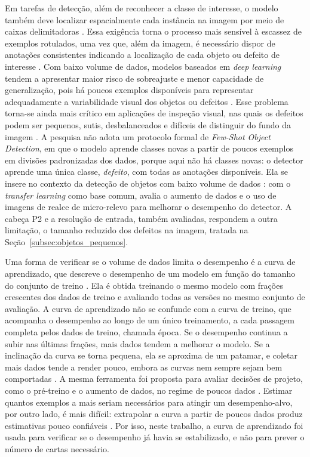 \documentclass[
    12pt,                %
    openright,           %
    oneside,             %
    a4paper,             %
    english,             %
    brazil               %
]{abntex2}
\begin{document}
Em tarefas de detecção, além de reconhecer a classe de interesse,
o modelo também deve localizar espacialmente cada instância na imagem
por meio de caixas delimitadoras \cite{Ramos2025}. Essa exigência torna
o processo mais sensível à escassez de exemplos rotulados, uma vez que,
além da imagem, é necessário dispor de anotações consistentes indicando
a localização de cada objeto ou defeito de interesse \cite{Situ2023}.
Com baixo volume de dados, modelos baseados em \textit{deep learning}
tendem a apresentar maior risco de sobreajuste e menor
capacidade de generalização, pois há poucos exemplos disponíveis para
representar adequadamente a variabilidade visual dos objetos ou
defeitos \cite{Wang2022}. Esse problema torna-se ainda mais crítico em
aplicações de inspeção visual, nas quais os defeitos podem ser pequenos,
sutis, desbalanceados e difíceis de distinguir do fundo da imagem
\cite{Chen2021, Wang2022}. A pesquisa não adota um protocolo formal de
\textit{Few-Shot Object Detection}, em que o modelo aprende classes
novas a partir de poucos exemplos em divisões padronizadas dos dados,
porque aqui não há classes novas: o detector aprende uma única classe,
\textit{defeito}, com todas as anotações disponíveis. Ela se insere no
contexto da detecção de objetos com
baixo volume de dados \cite{Situ2023}: com o \textit{transfer learning}
como base comum, avalia o aumento de dados e o uso de imagens de realce
de micro-relevo para melhorar o desempenho do detector. A cabeça P2 e a resolução de
entrada, também avaliadas, respondem a outra limitação, o tamanho
reduzido dos defeitos na imagem, tratada na
Seção~\ref{subsec:objetos_pequenos}.

Uma forma de verificar se o volume de dados limita o desempenho é a
curva de aprendizado, que descreve o desempenho de um modelo em função
do tamanho do conjunto de treino \cite{Viering2023}. Ela é obtida
treinando o mesmo modelo com frações crescentes dos dados de treino e
avaliando todas as versões no mesmo conjunto de avaliação. A curva de
aprendizado não se confunde com a curva de treino, que acompanha o
desempenho ao longo de um único treinamento, a cada passagem completa
pelos dados de treino, chamada época. Se o desempenho continua a subir
nas últimas frações, mais dados tendem a melhorar o modelo. Se a
inclinação da curva se torna pequena, ela se aproxima de um patamar, e
coletar mais dados tende a render pouco, embora as curvas nem sempre
sejam bem comportadas \cite{Viering2023}. A mesma ferramenta
foi proposta para avaliar decisões de projeto, como o pré-treino e o
aumento de dados, no regime de poucos dados \cite{Hoiem2021}. Estimar
quantos exemplos a mais seriam necessários para atingir um
desempenho-alvo, por outro lado, é mais difícil: extrapolar a curva a
partir de poucos dados produz estimativas pouco confiáveis
\cite{Mahmood2022}. Por isso, neste trabalho, a curva de aprendizado
foi usada para verificar se o desempenho já havia se estabilizado, e
não para prever o número de cartas necessário.
\end{document}
